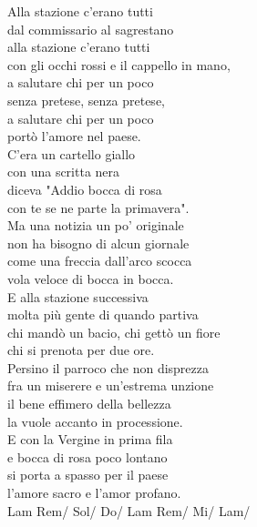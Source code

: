 \documentclass[10pt, twoside, a4paper]{article}
\begin{document}
Alla stazione c'erano tutti \\
dal commissario al sagrestano \\
alla stazione c'erano tutti \\
con gli occhi rossi e il cappello in mano, \\

a salutare chi per un poco \\
senza pretese, senza pretese, \\
a salutare chi per un poco \\
port\`o l'amore nel paese. \\

C'era un cartello giallo \\
con una scritta nera \\
diceva "Addio bocca di rosa \\
con te se ne parte la primavera". \\

Ma una notizia un po' originale \\
non ha bisogno di alcun giornale \\
come una freccia dall'arco scocca \\
vola veloce di bocca in bocca. \\

E alla stazione successiva \\
molta pi\`u gente di quando partiva \\
chi mand\`o un bacio, chi gett\`o un fiore \\
chi si prenota per due ore. \\

Persino il parroco che non disprezza \\
fra un miserere e un'estrema unzione \\
il bene effimero della bellezza \\
la vuole accanto in processione. \\

E con la Vergine in prima fila \\
e bocca di rosa poco lontano \\
si porta a spasso per il paese \\
l'amore sacro e l'amor profano. \\

Lam Rem/ Sol/ Do/ Lam Rem/ Mi/ Lam/
\end{document}
